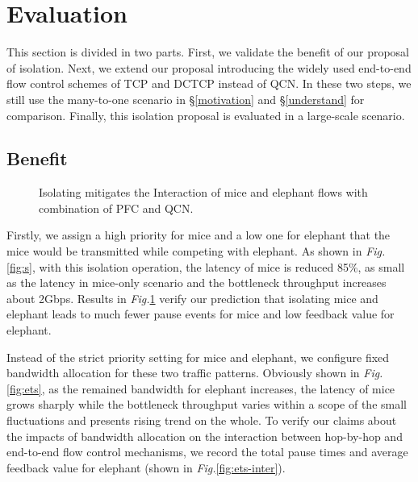 \documentclass[]{sig-alternate-10pt}
\begin{document}
 
\section{Evaluation}
\label{evaluation}
This section is divided in two parts. First,  we validate the benefit of our proposal of isolation.  
Next, we extend our proposal introducing the widely used end-to-end flow control schemes of TCP and DCTCP instead of QCN.
In these two steps, we still use the many-to-one scenario in \S\ref{motivation} and \S\ref{understand} for comparison.
Finally, this isolation proposal is evaluated in a large-scale scenario. \subsection{Benefit}

\begin{figure}[t]
	\centering
	\caption{Isolating mitigates the Interaction of mice and elephant flows with combination of PFC and QCN. }
	\label{fig:solution}	
\end{figure}

Firstly, we assign a high priority for mice and a low one for elephant that the mice would be transmitted while competing with elephant.
As shown in \emph{Fig.}\ref{fig:s}, with this isolation operation, the latency of mice is reduced 85\%, as small as the latency in mice-only scenario and the bottleneck throughput increases about 2Gbps.
Results in \emph{Fig.}\ref{fig:solution} verify our prediction that isolating mice and elephant leads to much fewer pause events for mice and low feedback value for elephant.


Instead of the strict priority setting for mice and elephant, we configure fixed bandwidth allocation for these two traffic patterns.
Obviously shown in \emph{Fig.}\ref{fig:ets}, 
as the remained bandwidth for elephant increases, the latency of mice grows sharply while the bottleneck throughput varies within a scope of the small fluctuations and presents rising trend on the whole.
To verify our claims about the impacts of bandwidth allocation on the interaction between hop-by-hop and end-to-end flow control mechanisms, we record the total pause times and average feedback value for elephant (shown in \emph{Fig.}\ref{fig:ets-inter}).
\end{document}
